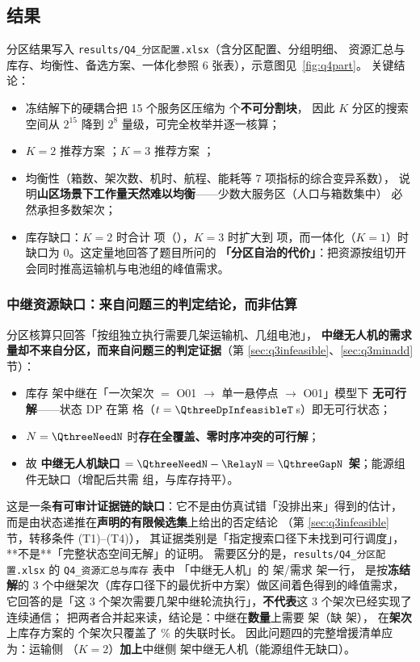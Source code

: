 \documentclass[12pt,a4paper,fontset=windows]{ctexart}
\begin{document}
\subsection{结果}\label{sec:q4gap}
分区结果写入 \texttt{results/Q4\_分区配置.xlsx}（含分区配置、分组明细、
资源汇总与库存、均衡性、备选方案、一体化参照 6 张表），示意图见~\ref{fig:q4part}。
关键结论：
\begin{itemize}[leftmargin=2.2em,itemsep=2pt]
\item 冻结解下的硬耦合把 15 个服务区压缩为 \QfourBlocks 个\textbf{不可分割块}，
      因此 $K$ 分区的搜索空间从 $2^{15}$ 降到 $2^{8}$ 量级，可完全枚举并逐一核算；
\item $K=2$ 推荐方案 \QfourKTwo；$K=3$ 推荐方案 \QfourKThree；
\item 均衡性（箱数、架次数、机时、航程、能耗等 7 项指标的综合变异系数）\QfourBalance，
      说明\textbf{山区场景下工作量天然难以均衡}——少数大服务区（人口与箱数集中）
      必然承担多数架次；
\item 库存缺口：$K=2$ 时合计 \QfourGap 项（\QfourKind），$K=3$ 时扩大到
      \QfourGapThree 项，而一体化（$K=1$）时缺口为 0。这定量地回答了题目所问的
      \textbf{「分区自治的代价」}：把资源按组切开会同时推高运输机与电池组的峰值需求。
\end{itemize}

\subsubsection{中继资源缺口：来自问题三的判定结论，而非估算}
分区核算只回答「按组独立执行需要几架运输机、几组电池」，
\textbf{中继无人机的需求量却不来自分区，而来自问题三的判定证据}（第 \ref{sec:q3infeasible}、\ref{sec:q3minadd} 节）：
\begin{itemize}[leftmargin=2.2em,itemsep=2pt]
\item 库存 \RelayN{} 架中继在「一次架次 $=$ O01 $\to$ 单一悬停点 $\to$ O01」模型下
      \textbf{无可行解}——状态 DP 在第 \QthreeDpInfeasibleCell{} 格（$t=\QthreeDpInfeasibleT$\,s）即无可行状态；
\item $N=\QthreeNeedN$ 时\textbf{存在全覆盖、零时序冲突的可行解}；
\item 故 \textbf{中继无人机缺口 $= \QthreeNeedN-\RelayN=\QthreeGapN$ 架}；能源组件无缺口（增配后共需 \RelayBat{} 组，与库存持平）。
\end{itemize}
这是一条\textbf{有可审计证据链的缺口}：它不是由仿真试错「没排出来」得到的估计，
而是由状态递推在\textbf{声明的有限候选集}上给出的否定结论
（第 \ref{sec:q3infeasible} 节，转移条件 (T1)--(T4)），
其证据类别是「指定搜索口径下未找到可行调度」，**不是**「完整状态空间无解」的证明。
需要区分的是，\texttt{results/Q4\_分区配置.xlsx} 的 \texttt{Q4\_资源汇总与库存} 表中
「中继无人机」的 \QfourRelayFrozen{} 架/需求 \RelayN{} 架一行，
是按\textbf{冻结解}的 3 个中继架次（库存口径下的最优折中方案）做区间着色得到的峰值需求，
它回答的是「这 3 个架次需要几架中继轮流执行」，\textbf{不代表}这 3 个架次已经实现了连续通信；
把两者合并起来读，结论是：中继在\textbf{数量}上需要 \QthreeNeedN{} 架（缺 \QthreeGapN{} 架），
在\textbf{架次}上库存方案的 \QthreeCompromiseSorties{} 个架次只覆盖了 \QthreeCompromiseCoverPct\% 的失联时长。
因此问题四的完整增援清单应为：运输侧
\QfourKind{}（$K=2$）\textbf{加上}中继侧 \QthreeGapN{} 架中继无人机（能源组件无缺口）。
\end{document}
